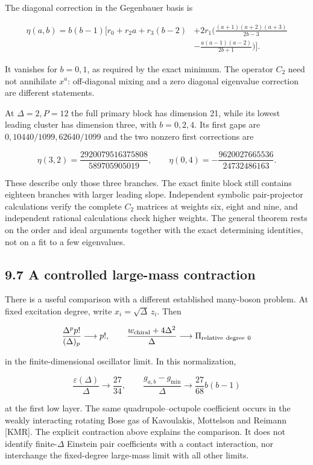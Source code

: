 The diagonal correction in the Gegenbauer basis is

\[
\begin{aligned}
\eta(a,b)=b(b-1)\bigg[
r_0+r_2a+r_3(b-2)
&+2r_1\bigg(
\frac{(a+1)(a+2)(a+3)}{2b-3}\\
&-\frac{a(a-1)(a-2)}{2b+1}
\bigg)\bigg].
\end{aligned}
\]

It vanishes for \(b=0,1\), as required by the exact minimum. The operator \(C_2\) need not annihilate \(x^a\): off-diagonal mixing and a zero diagonal eigenvalue correction are different statements.

At \(\Delta=2,P=12\) the full primary block has dimension 21, while its lowest leading cluster has dimension three, with \(b=0,2,4\). Its first gaps are \(0,10440/1099,62640/1099\) and the two nonzero first corrections are

\[
\eta(3,2)=\frac{2920079516375808}{589705905019},\qquad
\eta(0,4)=-\frac{9620027665536}{24732486163}.
\]

These describe only those three branches. The exact finite block still contains eighteen branches with larger leading slope. Independent symbolic pair-projector calculations verify the complete \(C_2\) matrices at weights six, eight and nine, and independent rational calculations check higher weights. The general theorem rests on the order and ideal arguments together with the exact determining identities, not on a fit to a few eigenvalues.

\hypertarget{a-controlled-large-mass-contraction}{%
\subsection{9.7 A controlled large-mass contraction}\label{a-controlled-large-mass-contraction}}

There is a useful comparison with a different established many-boson problem. At fixed excitation degree, write \(x_i=\sqrt{\Delta}\,z_i\). Then

\[
\frac{\Delta^p p!}{(\Delta)_p}\longrightarrow p!,
\qquad
\frac{w_{\rm chiral}+4\Delta^2}{\Delta}
\longrightarrow \Pi_{\rm relative\ degree\ 0}
\]

in the finite-dimensional oscillator limit. In this normalization,

\[
\frac{\varepsilon(\Delta)}{\Delta}\longrightarrow\frac{27}{34},
\qquad
\frac{g_{a,b}-g_{\min}}{\Delta}
\longrightarrow\frac{27}{68}b(b-1)
\]

at the first low layer. The same quadrupole--octupole coefficient occurs in the weakly interacting rotating Bose gas of Kavoulakis, Mottelson and Reimann {[}KMR{]}. The explicit contraction above explains the comparison. It does not identify finite-\(\Delta\) Einstein pair coefficients with a contact interaction, nor interchange the fixed-degree large-mass limit with all other limits.

